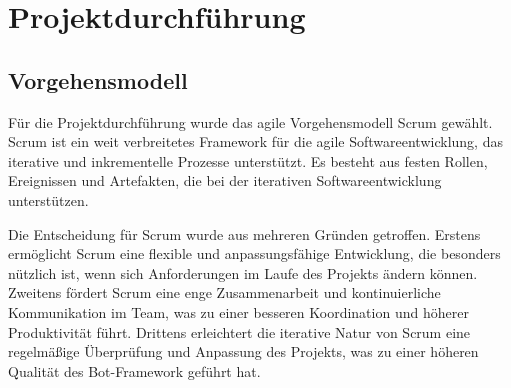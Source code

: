 
\section{Projektdurchführung}\label{projektdurchfuxfchrung}


\subsection{Vorgehensmodell}\label{vorgehensmodell}

Für die Projektdurchführung wurde das agile Vorgehensmodell \gls{Scrum} gewählt. Scrum ist ein weit verbreitetes Framework für die agile Softwareentwicklung, das iterative und inkrementelle Prozesse unterstützt. Es besteht aus festen Rollen, Ereignissen und Artefakten, die bei der iterativen Softwareentwicklung unterstützen.

Die Entscheidung für Scrum wurde aus mehreren Gründen getroffen. Erstens ermöglicht Scrum eine flexible und anpassungsfähige Entwicklung, die besonders nützlich ist, wenn sich Anforderungen im Laufe des Projekts ändern können. Zweitens fördert Scrum eine enge Zusammenarbeit und kontinuierliche Kommunikation im Team, was zu einer besseren Koordination und höherer Produktivität führt. Drittens erleichtert die iterative Natur von Scrum eine regelmäßige Überprüfung und Anpassung des Projekts, was zu einer höheren Qualität des Bot-Framework geführt hat.

